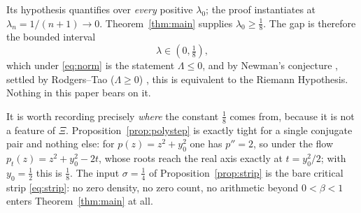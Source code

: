 \documentclass[11pt]{article}
\theoremstyle{definition}
\begin{document}
\noindent Its hypothesis quantifies over \emph{every} positive $\lambda_0$; the proof instantiates at
$\lambda_n=1/(n+1)\to0$.  Theorem~\ref{thm:main} supplies $\lambda_0\ge\tfrac18$.  The gap is therefore
the bounded interval
\[
  \lambda\in\left(0,\tfrac18\right),
\]
which under \eqref{eq:norm} is the statement $\Lambda\le0$, and by Newman's conjecture \cite{Newman1976}, settled by
Rodgers--Tao ($\Lambda\ge0$) \cite{RodgersTao2020}, this is equivalent to the Riemann Hypothesis.  Nothing in this paper
bears on it.

It is worth recording precisely \emph{where} the constant $\tfrac18$ comes from, because it is not a
feature of $\Xi$.  Proposition~\ref{prop:polystep} is exactly tight for a single conjugate pair and
nothing else: for $p(z)=z^{2}+y_0^{2}$ one has $p''=2$, so under the flow
$p_t(z)=z^{2}+y_0^{2}-2t$, whose roots reach the real axis exactly at $t=y_0^{2}/2$; with
$y_0=\tfrac12$ this is $\tfrac18$.  The input $\sigma=\tfrac14$ of Proposition~\ref{prop:strip} is the
bare critical strip \eqref{eq:strip}: no zero density, no zero count, no arithmetic beyond
$0<\beta<1$ enters Theorem~\ref{thm:main} at all.
\end{document}
